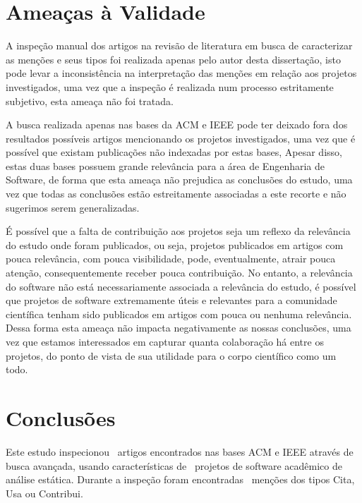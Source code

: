 
\section{Ameaças à Validade}  \label{estudo2:ameacas} %

A inspeção manual dos artigos na revisão de literatura em busca de caracterizar
as menções e seus tipos foi realizada apenas pelo autor desta dissertação, isto
pode levar a inconsistência na interpretação das menções em relação aos projetos
investigados, uma vez que a inspeção é realizada num processo estritamente
subjetivo, esta ameaça não foi tratada.

A busca realizada apenas nas bases da ACM e IEEE pode ter deixado fora dos
resultados possíveis artigos mencionando os projetos investigados, uma vez que
é possível que existam publicações não indexadas por estas bases, Apesar disso,
estas duas bases possuem grande relevância para a área de Engenharia de
Software, de forma que esta ameaça não prejudica as conclusões do estudo, uma
vez que todas as conclusões estão estreitamente associadas a este recorte e não
sugerimos serem generalizadas.

É possível que a falta de contribuição aos projetos seja um reflexo da
relevância do estudo onde foram publicados, ou seja, projetos publicados em
artigos com pouca relevância, com pouca visibilidade, pode, eventualmente,
atrair pouca atenção, consequentemente receber pouca contribuição. No entanto,
a relevância do software não está necessariamente associada a relevância do
estudo, é possível que projetos de software extremamente úteis e relevantes
para a comunidade científica tenham sido publicados em artigos com pouca ou
nenhuma relevância. Dessa forma esta ameaça não impacta negativamente as nossas
conclusões, uma vez que estamos interessados em capturar quanta colaboração há
entre os projetos, do ponto de vista de sua utilidade para o corpo científico
como um todo.


\section{Conclusões} \label{estudo2:conclusoes} %

Este estudo inspecionou \SearchUniqueCount \ artigos encontrados nas bases ACM
e IEEE através de busca avançada, usando características de \SoftwareCount \
projetos de software acadêmico de análise estática. Durante a inspeção foram
encontradas \ScreeningCount \ menções dos tipos Cita, Usa ou
Contribui.


